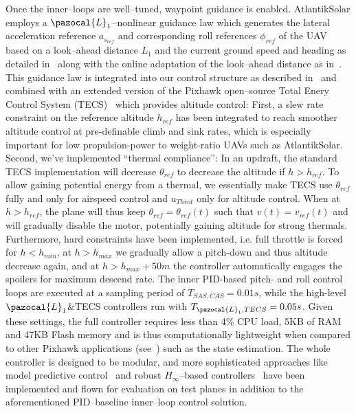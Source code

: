 Once the inner--loops are well--tuned, waypoint guidance is enabled. AtlantikSolar employs a $\pazocal{L}_1$--nonlinear guidance law which generates the lateral acceleration reference $a_{s_{ref}}$ and corresponding roll references $\phi_{ref}$ of the UAV based on a look--ahead distance ${L}_1$ and the current ground speed and heading as detailed in~\cite{HOW_L1nav} along with the online adaptation of the look--ahead distance as in~\cite{park2007performance}. This guidance law is integrated into our control structure as described in~\cite{Oettershagen_MED14_L1MPC} and combined with an extended version of the Pixhawk open--source Total Enery Control System (TECS)~\cite{PixhawkWebsite} which provides altitude control: First, a slew rate constraint on the reference altitude $h_{ref}$ has been integrated to reach smoother altitude control at pre-definable climb and sink rates, which is especially important for low propulsion-power to weight-ratio UAVs such as AtlantikSolar. Second, we've implemented ``thermal compliance'': In an updraft, the standard TECS implementation will decrease $\theta_{ref}$ to decrease the altitude if $h>h_{ref}$. To allow gaining potential energy from a thermal, we essentially make TECS use $\theta_{ref}$ fully and only for airspeed control and $u_{Throt}$ only for altitude control. When at $h>h_{ref}$, the plane will thus keep $\theta_{ref}=\theta_{ref}(t)$  such that $v(t)=v_{ref}(t)$ and will gradually disable the motor, potentially gaining altitude for strong thermals. Furthermore, hard constraints have been implemented, i.e. full throttle is forced for $h<h_{min}$, at $h>h_{max}$ we gradually allow a pitch-down and thus altitude decrease again, and at $h>h_{max}+50m$ the controller automatically engages the spoilers for maximum descend rate. The inner PID-based pitch- and roll control loops are executed at a sampling period of $T_{SAS,CAS}=0.01s$, while the high-level $\pazocal{L}_1$\&TECS controllers run with $T_{\pazocal{L}_1,TECS}=0.05s$. Given these settings, the full controller requires less than 4\% CPU load, 5KB of RAM and 47KB Flash memory and is thus computationally lightweight when compared to other Pixhawk applications (see~\cite{Oettershagen_MED14_L1MPC}) such as the state estimation. The whole controller is designed to be modular, and more sophisticated approaches like model predictive control~\cite{Oettershagen_MED14_L1MPC} and robust $H_\infty$--based controllers~\cite{Mosimann_FT} have been implemented and flown for evaluation on test planes in addition to the aforementioned PID--baseline inner--loop control solution. 